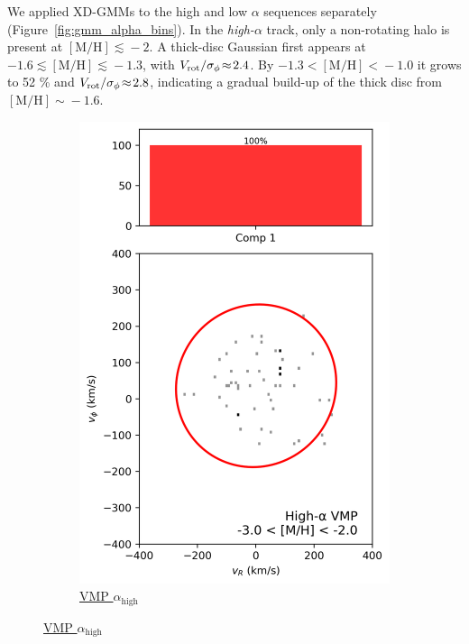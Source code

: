 \documentclass[a4paper,10pt]{article}
\begin{document}
\begin{multicols}{2}
We applied XD-GMMs to the high and low $\alpha$ sequences separately (Figure~\ref{fig:gmm_alpha_bins}).  
In the \textit{high-$\alpha$} track, only a non-rotating halo is present at $\mathrm{[M/H]}\!\lesssim\!-2$.  
A thick-disc Gaussian first appears at $-1.6\!\lesssim\!\mathrm{[M/H]}\!\lesssim\!-1.3$, with $V_{\rm rot}/\sigma_{\phi}\!\approx\!2.4$.  
By $-1.3\!<\!\mathrm{[M/H]}\!<\!-1.0$ it grows to 52 \% and $V_{\rm rot}/\sigma_{\phi}\!\approx\!2.8$, indicating a gradual build-up of 
the thick disc from $\mathrm{[M/H]}\!\sim\!-1.6$.

\begin{figure}[H]
  \centering
  \begin{subfigure}[t]{0.24\linewidth}
    \includegraphics[width=\linewidth]{../figures/gmm_vmp_high_alpha_k1.png}
    \caption{\href{https://raw.githack.com/raunaq-rai/Disentangling-the-Milky-Way-using-GMM/main/figures/VMP\_high\_\_\_-3\%5BM\_H\%5D-2.html}{VMP $\alpha_{\mathrm{high}}$}}

\end{subfigure}
\end{figure}
\end{multicols}
\end{document}
